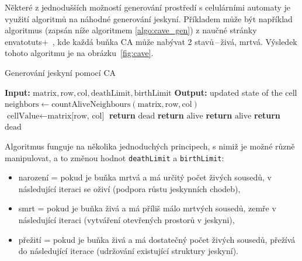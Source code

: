 Některé z jednodušších možností generování prostředí s celulárními automaty je využití algoritmů na náhodné generování jeskyní. Příkladem může být například algoritmus (zapsán níže algoritmem \ref{algo:cave_gen}) z naučné stránky envatotuts+~\cite{CaveCA}, kde každá buňka CA může nabývat 2 stavů\,--\,živá, mrtvá. Výsledek tohoto algoritmu je na obrázku~\ref{fig:cave}.
\begin{algorithm}
\caption{Generování jeskyní pomocí CA}\label{algo:cave_gen}
\begin{algorithmic}[1]
\State \textbf{Input:} $\text{matrix}, \text{row}, \text{col}, \text{deathLimit}, \text{birthLimit}$
\State \textbf{Output:} updated state of the cell
\State $\text{neighbors} \gets \text{countAliveNeighbours}(\text{matrix}, \text{row}, \text{col})$
\State $\text{cellValue} \gets \text{matrix[row, col]}$
      
        \State \textbf{return} $\text{dead}$
    \Else {} 
        \State \textbf{return} $\text{alive}$
    \EndIf
\Else
      
        \State \textbf{return} $\text{alive}$
    \Else
        \State \textbf{return} $\text{dead}$
    \EndIf
\EndIf
\end{algorithmic}
\end{algorithm}
\newline
Algoritmus funguje na několika jednoduchých principech, s nimiž je možné různě manipulovat, a to změnou hodnot \verb|deathLimit| a \verb|birthLimit|:
\begin{itemize}
    \item narození = pokud je buňka mrtvá a má určitý počet živých sousedů, v následující iteraci se oživí (podpora růstu jeskynních chodeb),
    \item smrt = pokud je buňka živá a má příliš málo mrtvých sousedů, zemře v následující iteraci (vytváření otevřených prostorů v jeskyni),
    \item přežití = pokud je buňka živá a má dostatečný počet živých sousedů, přežívá do následující iterace (udržování existující struktury jeskyní).
\end{itemize}

